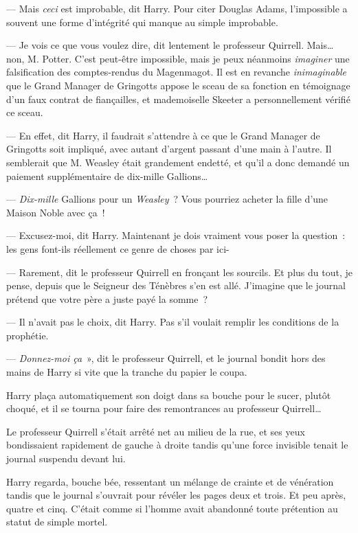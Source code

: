 --- Mais \emph{ceci} est improbable, dit Harry.
Pour citer Douglas Adams, l'impossible a souvent une forme d'intégrité qui manque au simple improbable.

--- Je vois ce que vous voulez dire, dit lentement le professeur Quirrell.
Mais… non, M. Potter.
C'est peut-être impossible, mais je peux néanmoins \emph{imaginer} une falsification des comptes-rendus du Magenmagot.
Il est en revanche \emph{inimaginable} que le Grand Manager de Gringotts appose le sceau de sa fonction en témoignage d'un faux contrat de fiançailles, et mademoiselle Skeeter a personnellement vérifié ce sceau.

--- En effet, dit Harry, il faudrait s'attendre à ce que le Grand Manager de Gringotts soit impliqué, avec autant d'argent passant d'une main à l'autre.
Il semblerait que M. Weasley était grandement endetté, et qu'il a donc demandé un paiement supplémentaire de dix-mille Gallions…

--- \emph{Dix-mille} Gallions pour un \emph{Weasley}~?
Vous pourriez acheter la fille d'une Maison Noble avec ça~!

--- Excusez-moi, dit Harry.
Maintenant je dois vraiment vous poser la question~: les gens font-ils réellement ce genre de choses par ici-

--- Rarement, dit le professeur Quirrell en fronçant les sourcils.
Et plus du tout, je pense, depuis que le Seigneur des Ténèbres s'en est allé.
J'imagine que le journal prétend que votre père a juste payé la somme~?

--- Il n'avait pas le choix, dit Harry.
Pas s'il voulait remplir les conditions de la prophétie.

--- \emph{Donnez-moi ça}~», dit le professeur Quirrell, et le journal bondit hors des mains de Harry si vite que la tranche du papier le coupa.

Harry plaça automatiquement son doigt dans sa bouche pour le sucer, plutôt choqué, et il se tourna pour faire des remontrances au professeur Quirrell…

Le professeur Quirrell s'était arrêté net au milieu de la rue, et ses yeux bondissaient rapidement de gauche à droite tandis qu'une force invisible tenait le journal suspendu devant lui.

Harry regarda, bouche bée, ressentant un mélange de crainte et de vénération tandis que le journal s'ouvrait pour révéler les pages deux et trois.
Et peu après, quatre et cinq.
C'était comme si l'homme avait abandonné toute prétention au statut de simple mortel.

